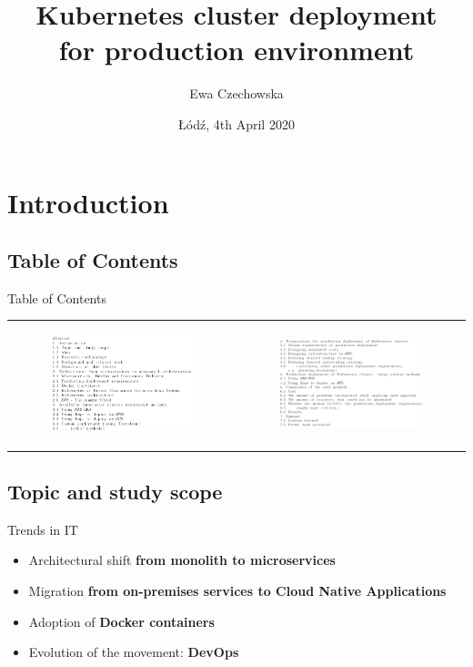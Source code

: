 \documentclass{beamer}
\title{Kubernetes cluster deployment \\ for production environment}
\author{Ewa Czechowska}
\institute{Lodz University of Technology}
\date{Łódź, 4th April 2020}
\begin{document}
\maketitle

\section{Introduction}
\subsection{Table of Contents}
\begin{frame}{Table of Contents}%
\begin{center}
\begin{tabular}{@{}  l  l }
	\begin{figure}
		\includegraphics[width=5.5cm]{figures/table-of-c1.png}
		\label{fig:table-of-c1}
	\end{figure} &
	\begin{figure}
		\includegraphics[width=5.5cm]{figures/table-of-c2.png}
		\label{fig:table-of-c2}
	\end{figure} \\
	\end{tabular}
\end{center}
\end{frame}

\subsection{Topic and study scope}
\begin{frame}{Trends in IT}%
\begin{itemize}
\item Architectural shift {\bfseries from monolith to microservices}
\item Migration {\bfseries from on-premises services to Cloud Native Applications}
\item Adoption of {\bfseries Docker containers}
\item Evolution of the movement: {\bfseries DevOps}
\end{itemize}
\end{frame}
\end{document}

